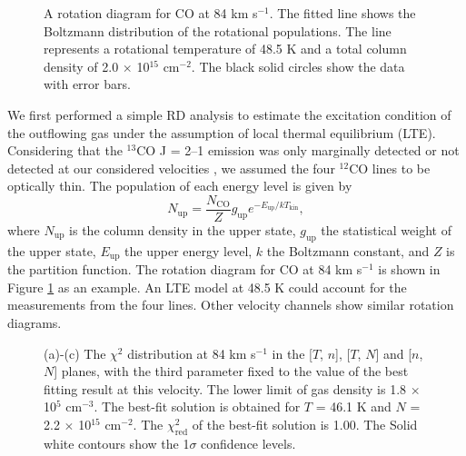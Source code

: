 \begin{figure}[tbp]
\caption{A rotation diagram for CO at 84 km s$^{-1}$. The fitted line shows the Boltzmann distribution of the rotational populations. The line represents a rotational temperature of 48.5 K and a total column density of 2.0 $\times$ 10$^{15}$ cm$^{-2}$. The black solid circles show the data with error bars. \label{fig:figrd}}
\end{figure}

We first performed a simple RD analysis \citep{1999ApJ...517..209G} to estimate the excitation condition of the outflowing gas under the assumption of local thermal equilibrium (LTE). Considering that the $^{13}$CO J = 2--1 emission was only marginally detected or not detected at our considered velocities \citep{2009ApJ...696...66Q}, we assumed the four $^{12}$CO lines to be optically thin. The population of each energy level is given by 
\begin{equation}
N_{\mathrm{up}} = \frac{N_\mathrm{CO}}{Z} g_\mathrm{up} e^{-E_\mathrm{up}/kT_\mathrm{kin}},
\end{equation}
where $N_\mathrm{up}$ is the column density in the upper state, $g_\mathrm{up}$ the statistical weight of the upper state, $E_\mathrm{up}$ the upper energy level, $k$ the Boltzmann constant, and $Z$ is the partition function. The rotation diagram for CO at 84 km s$^{-1}$ is shown in Figure \ref{fig:figrd} as an example. An LTE model at 48.5 K could account for the measurements from the four lines. Other velocity channels show similar rotation diagrams.


\begin{figure}[!tbp]
\caption{(a)-(c) The $\chi^2$ distribution at 84 km s$^{-1}$ in the [$T$, $n$], [$T$, $N$] and [$n$, $N$] planes, with the third parameter fixed to the value of the best fitting result at this velocity. The lower limit of gas density is 1.8 $\times$ 10$^{5}$ cm$^{-3}$. The best-fit solution is obtained for $T$ =  46.1 K and $N$ = 2.2 $\times$ 10$^{15}$ cm$^{-2}$. The $\chi^2_{\mathrm{red}}$ of the best-fit solution is 1.00. The Solid white contours show the 1$\sigma$ confidence levels. \label{fig:figchi}}
\end{figure}

